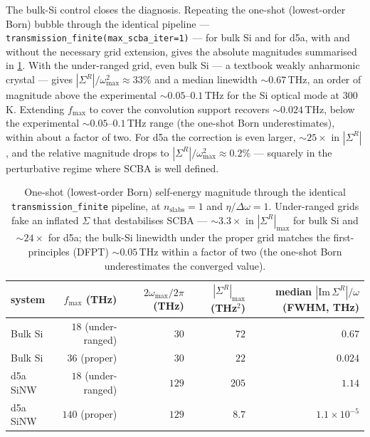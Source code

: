 The bulk-Si control closes the diagnosis. Repeating the
one-shot (lowest-order Born) bubble through the identical pipeline ---
\texttt{transmission\_finite(max\_scba\_iter=1)} --- for bulk Si and
for d5a, with and without the necessary grid extension, gives the
absolute magnitudes summarised in
\cref{tab:fmax_aliasing_one_shot}. With the under-ranged grid, even
bulk Si --- a textbook weakly anharmonic crystal --- gives
$|\Sigma^{R}|/\omega_{\max}^{2}\approx 33\%$ and a median linewidth
$\sim 0.67$\,THz, an order of magnitude above the experimental
$\sim 0.05$--$0.1$\,THz for the Si optical mode at $300$\,K. Extending
$f_{\max}$ to cover the convolution support recovers
$\sim 0.024$\,THz, below the experimental $\sim 0.05$--$0.1$\,THz range
(the one-shot Born underestimates), within about a factor of two. For d5a the
correction is even larger, $\sim 25\times$ in $|\Sigma^{R}|$, and the
relative magnitude drops to $|\Sigma^{R}|/\omega_{\max}^{2}\approx
0.2\%$ --- squarely in the perturbative regime where SCBA is well
defined.

\begin{table}[ht]
  \centering
  \begin{tabular}{lrrrr}
    \hline
    system & $f_{\max}$ (THz) & $2\omega_{\max}/2\pi$ (THz)
      & $|\Sigma^{R}|_{\max}$ (THz$^{2}$)
      & median $|\mathrm{Im}\,\Sigma^{R}|/\omega$ (FWHM, THz) \\
    \hline
    Bulk Si & $18$ (under-ranged) & $30$  & $72$  & $0.67$ \\
    Bulk Si & $36$ (proper)       & $30$  & $22$  & $0.024$ \\
    d5a SiNW & $18$ (under-ranged) & $129$ & $205$ & $1.14$ \\
    d5a SiNW & $140$ (proper)      & $129$ & $8.7$ & $1.1\times10^{-5}$ \\
    \hline
  \end{tabular}
  \caption{One-shot (lowest-order Born) self-energy magnitude through
  the identical \texttt{transmission\_finite} pipeline, at
  $n_\mathrm{slabs}=1$ and $\eta/\Delta\omega=1$. Under-ranged grids
  fake an inflated $\Sigma$ that destabilises SCBA ---
  $\sim3.3\times$ in $|\Sigma^R|_{\max}$ for bulk Si and $\sim24\times$
  for d5a;
  the bulk-Si linewidth under the proper grid matches the first-principles (DFPT)
  $\sim 0.05$\,THz \cite{debernardi_PRB_1995} within a factor of two
  (the one-shot Born underestimates the converged value).}
  \label{tab:fmax_aliasing_one_shot}
\end{table}

